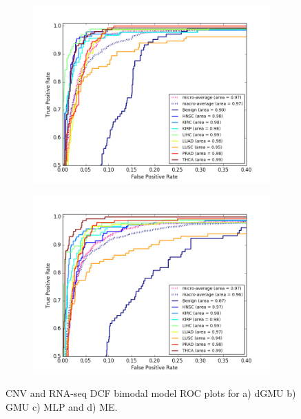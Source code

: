 \begin{figure}[H]
\begin{subfigure}[b]{0.49\textwidth}
         \caption{}
     \end{subfigure}
     \hfill
     \begin{subfigure}[b]{0.49\textwidth}
         \centering
         \includegraphics[width=\textwidth]{img/c_r/c_r_dcf_mlp_roc.png}
         \caption{}
     \end{subfigure}
     \begin{subfigure}[b]{0.49\textwidth}
         \centering
         \includegraphics[width=\textwidth]{img/c_r/c_r_dcf_moe_roc.png}
         \caption{}
     \end{subfigure}
        \caption{CNV and RNA-seq DCF bimodal model ROC plots for a) dGMU b) GMU c) MLP and d) ME.}
        \label{fig:c_r_dcf_roc}
\end{figure}

